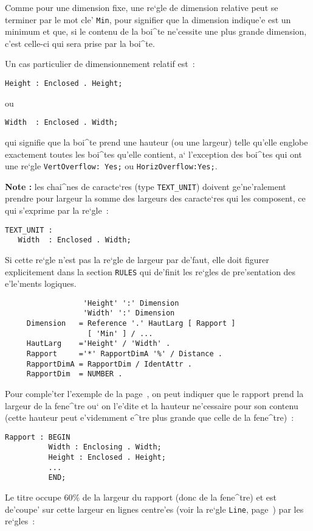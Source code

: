 {Comme pour une dimension fixe, une re`gle de dimension relative peut se
terminer par le mot cle' {\tt Min}, pour signifier que
la dimension indique'e est un minimum et que, si le contenu de la boi^te
ne'cessite une plus grande dimension, c'est celle-ci qui sera prise par
la boi^te.

Un cas particulier de dimensionnement relatif est~:
\begin{verbatim}
Height : Enclosed . Height;
\end{verbatim}
ou
\begin{verbatim}
Width  : Enclosed . Width;
\end{verbatim}
qui signifie que la boi^te prend une hauteur (ou une largeur) telle qu'elle
englobe exactement toutes les boi^tes qu'elle contient, a` l'exception des
boi^tes qui ont une re`gle {\tt VertOverflow: Yes;} ou {\tt HorizOverflow:Yes;}.

{\bf Note :} les chai^nes de caracte`res (type {\tt TEXT\_UNIT}) doivent
ge'ne'ralement prendre pour largeur la somme des largeurs des caracte`res qui
les composent, ce qui s'exprime par la re`gle~:
\begin{verbatim}
TEXT_UNIT :
   Width  : Enclosed . Width;
\end{verbatim}
Si cette re`gle n'est pas la re`gle de largeur par de'faut, elle doit figurer
explicitement dans la section {\tt RULES} qui de'finit les re`gles de
pre'sentation des e'le'ments logiques.

\begin{verbatim}
                  'Height' ':' Dimension
                  'Width' ':' Dimension
     Dimension   = Reference '.' HautLarg [ Rapport ]
                   [ 'Min' ] / ...
     HautLarg    ='Height' / 'Width' .
     Rapport     ='*' RapportDimA '%' / Distance .
     RapportDimA = RapportDim / IdentAttr .
     RapportDim  = NUMBER .
\end{verbatim}

\begin{example}
Pour comple'ter l'exemple de la page~\pageref{expos1}, on peut indiquer que
le rapport prend la largeur de la fene^tre ou` on l'e'dite et la hauteur
ne'cessaire pour son contenu (cette hauteur peut e'videmment e^tre plus
grande que celle de la fene^tre)~:

\begin{verbatim}
Rapport : BEGIN
          Width : Enclosing . Width;
          Height : Enclosed . Height;
          ...
          END;
\end{verbatim}
Le titre occupe 60\% de la largeur du rapport (donc de la fene^tre) et est
de'coupe' sur cette largeur en lignes centre'es (voir la re`gle {\tt Line},
page~\pageref{regleline}) par les re`gles~:


\end{example}}
